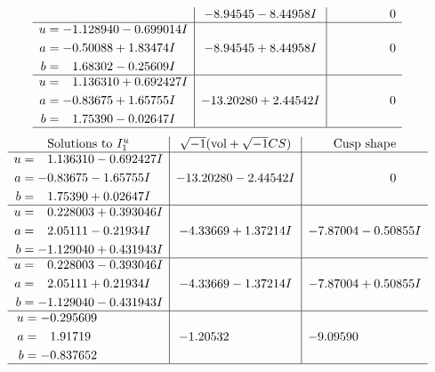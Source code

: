 \documentclass[1p]{elsarticle_modified}
\theoremstyle{definition}
\newcommand{\I}{\sqrt{-1}}
\begin{document}
$$\begin{array}{c|c|c}
 & -8.94545 - 8.44958 I & \phantom{-0.000000 } 0 \\ \hline\begin{aligned}
u &= -1.128940 - 0.699014 I \\
a &= -0.50088 + 1.83474 I \\
b &= \phantom{-}1.68302 - 0.25609 I\end{aligned}
 & -8.94545 + 8.44958 I & \phantom{-0.000000 } 0 \\ \hline\begin{aligned}
u &= \phantom{-}1.136310 + 0.692427 I \\
a &= -0.83675 + 1.65755 I \\
b &= \phantom{-}1.75390 - 0.02647 I\end{aligned}
 & -13.20280 + 2.44542 I & \phantom{-0.000000 } 0\\
 \hline 
 \end{array}$$\newpage$$\begin{array}{c|c|c}  
\text{Solutions to }I^u_{1}& \I (\text{vol} + \sqrt{-1}CS) & \text{Cusp shape}\\
 \hline 
\begin{aligned}
u &= \phantom{-}1.136310 - 0.692427 I \\
a &= -0.83675 - 1.65755 I \\
b &= \phantom{-}1.75390 + 0.02647 I\end{aligned}
 & -13.20280 - 2.44542 I & \phantom{-0.000000 } 0 \\ \hline\begin{aligned}
u &= \phantom{-}0.228003 + 0.393046 I \\
a &= \phantom{-}2.05111 - 0.21934 I \\
b &= -1.129040 + 0.431943 I\end{aligned}
 & -4.33669 + 1.37214 I & -7.87004 - 0.50855 I \\ \hline\begin{aligned}
u &= \phantom{-}0.228003 - 0.393046 I \\
a &= \phantom{-}2.05111 + 0.21934 I \\
b &= -1.129040 - 0.431943 I\end{aligned}
 & -4.33669 - 1.37214 I & -7.87004 + 0.50855 I \\ \hline\begin{aligned}
u &= -0.295609\phantom{ +0.000000I} \\
a &= \phantom{-}1.91719\phantom{ +0.000000I} \\
b &= -0.837652\phantom{ +0.000000I}\end{aligned}
 & -1.20532\phantom{ +0.000000I} & -9.09590\phantom{ +0.000000I}\\
 \hline 
 \end{array}$$\newpage\newpage\renewcommand{\arraystretch}{1}
\end{document}
